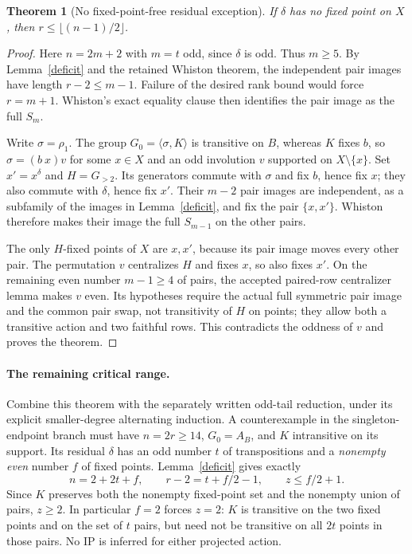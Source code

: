 \documentclass[11pt,a4paper]{article}
\newtheorem{theorem}[lemma]{Theorem}
\newcommand{\gen}[1]{\langle#1\rangle}
\begin{document}
\begin{theorem}[No fixed-point-free residual exception]\label{nofixed}
If $\delta$ has no fixed point on $X$, then
$r\leq\lfloor(n-1)/2\rfloor$.
\end{theorem}
\begin{proof}
Here $n=2m+2$ with $m=t$ odd, since $\delta$ is odd.
Thus $m\geq5$. By Lemma~\ref{deficit} and the retained
Whiston theorem, the independent pair images have length
$r-2\leq m-1$. Failure of the desired rank bound would force
$r=m+1$. Whiston's exact equality clause then identifies
the pair image as the full $S_m$.

Write $\sigma=\rho_1$. The group $G_0=\gen{\sigma,K}$
is transitive on $B$, whereas $K$ fixes $b$, so
$\sigma=(b\ x)v$ for some $x\in X$ and an odd involution
$v$ supported on $X\setminus\{x\}$. Set $x'=x^\delta$
and $H=G_{>2}$. Its generators commute with $\sigma$ and
fix $b$, hence fix $x$; they also commute with $\delta$,
hence fix $x'$. Their $m-2$ pair images are independent,
as a subfamily of the images in Lemma~\ref{deficit},
and fix the pair $\{x,x'\}$. Whiston therefore makes their
image the full $S_{m-1}$ on the other pairs.

The only $H$-fixed points of $X$ are $x,x'$, because its
pair image moves every other pair. The permutation $v$
centralizes $H$ and fixes $x$, so also fixes $x'$.
On the remaining even number $m-1\geq4$ of pairs, the
accepted paired-row centralizer lemma makes $v$ even.
Its hypotheses require the actual full symmetric pair image
and the common pair swap, not transitivity of $H$ on points;
they allow both a transitive action and two faithful rows.
This contradicts the oddness of $v$ and proves the theorem.
\end{proof}

\paragraph{The remaining critical range.}
Combine this theorem with the separately written odd-tail
reduction, under its explicit smaller-degree alternating
induction. A counterexample in the singleton-endpoint branch
must have $n=2r\geq14$, $G_0=A_B$, and $K$ intransitive
on its support. Its residual $\delta$ has an odd number $t$
of transpositions and a \emph{nonempty even} number $f$ of
fixed points. Lemma~\ref{deficit} gives exactly
\[
 n=2+2t+f,\qquad r-2=t+f/2-1,\qquad
                         z\leq f/2+1.                 \tag{2}
\]
Since $K$ preserves both the nonempty fixed-point set and
the nonempty union of pairs, $z\geq2$. In particular $f=2$
forces $z=2$: $K$ is transitive on the two fixed points and
on the set of $t$ pairs, but need not be transitive on all
$2t$ points in those pairs. No IP is inferred for either
projected action.
\end{document}
